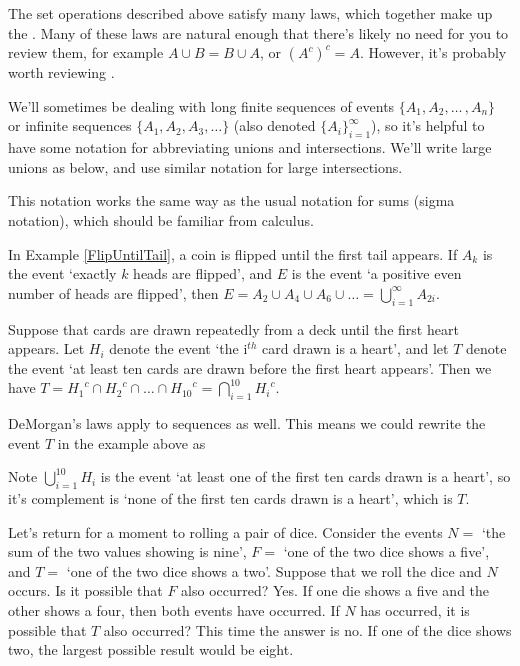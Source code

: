 \par
The set operations described above satisfy many laws, which together make up the . Many of these laws are natural enough that there's likely no need for you to review them, for example $A \cup B = B \cup A$, or $(A^{c})^{c} = A$. However, it's probably worth reviewing . 
\par 
We'll sometimes be dealing with long finite sequences of events $\{A_1, A_2, \dots\,, A_n\}$ or infinite sequences $\{A_1, A_2, A_3, \dots\}$ (also denoted $\{A_i\}_{i=1}^{\infty}$), so it's helpful to have some notation for abbreviating unions and intersections. We'll write large unions as below, and use similar notation for large intersections.
\par
This notation works the same way as the usual notation for sums (sigma notation), which should be familiar from calculus.
\begin{examp}
In Example \ref{FlipUntilTail}, a coin is flipped until the first tail appears. If $A_k$ is the event `exactly $k$ heads are flipped', and $E$ is the event `a positive even number of heads are flipped', then $E = A_2 \cup A_4 \cup A_6 \cup \dots = \bigcup_{i=1}^{\infty} A_{2i}$.
\end{examp}
\begin{examp}
Suppose that cards are drawn repeatedly from a deck until the first heart appears. Let $H_i$ denote the event `the i$^{th}$ card drawn is a heart', and let $T$ denote the event `at least ten cards are drawn before the first heart appears'. Then we have $T = {H_1}^c \cap {H_2}^c \cap \dots \cap {H_{10}}^c = \bigcap_{i=1}^{10} {H_i}^c$.
\end{examp}
\rmk DeMorgan's laws apply to sequences as well. This means we could rewrite the event $T$ in the example above as
\par
\noindent Note $\bigcup_{i=1}^{10}H_i$ is the event `at least one of the first ten cards drawn is a heart', so it's complement is `none of the first ten cards drawn is a heart', which is $T$.
\par
Let's return for a moment to rolling a pair of dice. Consider the events $N =$ `the sum of the two values showing is nine', $F =$ `one of the two dice shows a five', and $T = $ `one of the two dice shows a two'. Suppose that we roll the dice and $N$ occurs. Is it possible that $F$ also occurred? Yes. If one die shows a five and the other shows a four, then both events have occurred. If $N$ has occurred, it is possible that $T$ also occurred? This time the answer is no. If one of the dice shows two, the largest possible result would be eight.
